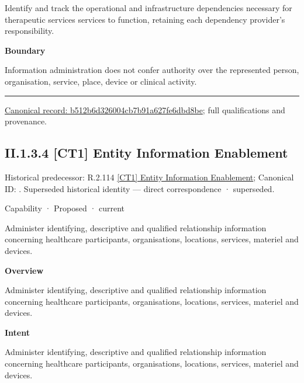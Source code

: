Identify and track the operational and infrastructure dependencies necessary for therapeutic services services to function, retaining each dependency provider's responsibility.



\textbf{Boundary}



Information administration does not confer authority over the represented person, organisation, service, place, device or clinical activity.



\medskip\hrule\medskip

{\footnotesize \href{../../../../continuum/strategy/capability/b512b6d326004cb7b91a627fe6dbd8be.md}{Canonical record: b512b6d326004cb7b91a627fe6dbd8be}; full qualifications and provenance.}\par
\subsection*{II.1.3.4 [CT1] Entity Information Enablement}
\label{navigation:II.1.3.4}

{\small Historical predecessor: R.2.114 \hyperref[element:e4d959d6c71d498c9ce00d2be4c048e3]{[CT1] Entity Information Enablement}; Canonical ID: \texttt{}. Superseded historical identity — direct correspondence · superseded.}\par
\label{element:b5a92874f8ac4509a30af5253590edc1}
{\small Capability · Proposed · current}\par

Administer identifying, descriptive and qualified relationship information concerning healthcare participants, organisations, locations, services, materiel and devices.



\textbf{Overview}



Administer identifying, descriptive and qualified relationship information concerning healthcare participants, organisations, locations, services, materiel and devices.



\textbf{Intent}



Administer identifying, descriptive and qualified relationship information concerning healthcare participants, organisations, locations, services, materiel and devices.



